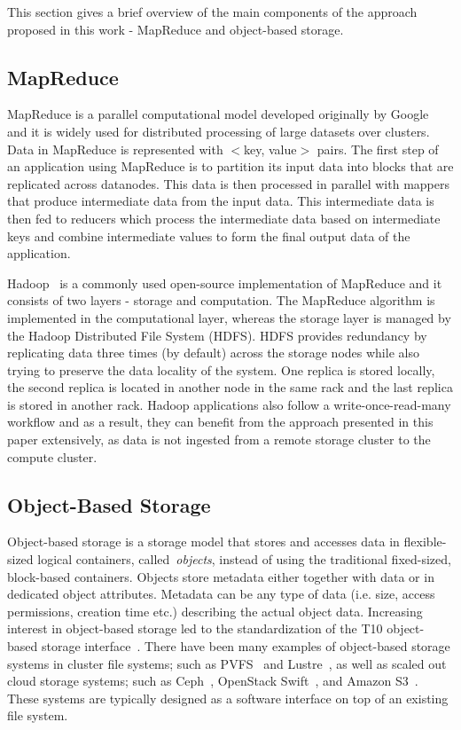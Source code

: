 \label{background}
This section gives a brief overview of the main components of the
approach proposed in this work - MapReduce and object-based storage.

\subsection{MapReduce}
\label{mapreduce}
MapReduce is a parallel computational model developed originally by Google~\cite{Dean:2008:MSD:1327452.1327492}
and it is widely used for distributed processing of large datasets over clusters. Data in MapReduce is
represented with $<$key, value$>$ pairs. The first step of an
application using MapReduce is to partition its input data
into blocks that are replicated across datanodes. This data is then
processed in parallel with mappers that
produce intermediate data from the input data. This intermediate data
is then fed to reducers which process
the intermediate data based on intermediate keys and combine intermediate values to form the final output data of
the application.

Hadoop~\cite{apache_hadoop} is a commonly used open-source implementation of MapReduce and it consists of
two layers - storage and computation. The MapReduce algorithm is implemented in the computational layer, whereas
the storage layer is managed by the Hadoop Distributed File System (HDFS). HDFS provides redundancy by replicating data
three times (by default) across the storage nodes while also trying to
preserve the data locality of the system. One
replica is stored locally, the second replica is located in another node in the same rack and the last replica is
stored in another rack. Hadoop applications also follow a write-once-read-many workflow and as a
result, they can benefit from the approach presented in this paper extensively, as data is not ingested
from a remote storage cluster to the compute cluster.

\subsection{Object-Based Storage}
Object-based storage is a storage model that stores and accesses data in flexible-sized logical
containers, called~\textit{objects}, instead of using the traditional fixed-sized, block-based
containers. Objects store metadata either together with data or in dedicated object attributes. Metadata can
be any type of data (i.e. size, access permissions, creation time etc.) describing the actual object data.
Increasing interest in object-based storage led to the standardization of the T10 object-based storage interface~\cite{osd3}.
There have been many examples of object-based storage systems in cluster file systems; such as PVFS~\cite{Carns:2000:PPF:1268379.1268407}
and Lustre~\cite{lustre_web}, as well as scaled out cloud storage systems; such as Ceph~\cite{cephorig},
OpenStack Swift~\cite{openstack_swift}, and Amazon S3~\cite{amazon_s3}. These systems are typically
designed as a software interface on top of an existing file system.
